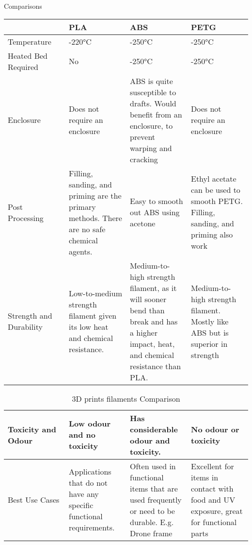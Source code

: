 \documentclass[class=report,11pt,crop=false]{standalone}
\begin{document}
Comparisons
\begin{table}[h]
\centering
\begin{tabular}{|>{\raggedright\arraybackslash}p{0.25\linewidth}|>{\raggedright\arraybackslash}p{0.25\linewidth}|>{\raggedright\arraybackslash}p{0.25\linewidth}|>{\raggedright\arraybackslash}p{0.25\linewidth}|}
\hline
 & \textbf{PLA} & \textbf{ABS} & \textbf{PETG} \\ \hline
Temperature & 180-220°C & 210-250°C & 220-250°C \\ \hline
Heated Bed Required & No & 210-250°C & 220-250°C \\ \hline
Enclosure & Does not require an enclosure & ABS is quite susceptible to drafts. Would benefit from an enclosure, to prevent warping and cracking & Does not require an enclosure \\ \hline
Post Processing & Filling, sanding, and priming are the primary methods. There are no safe chemical agents. & Easy to smooth out ABS using acetone & Ethyl acetate can be used to smooth PETG. Filling, sanding, and priming also work \\ \hline
Strength and Durability & Low-to-medium strength filament given its low heat and chemical resistance. & Medium-to-high strength filament, as it will sooner bend than break and has a higher impact, heat, and chemical resistance than PLA. & Medium-to-high strength filament. Mostly like ABS but is superior in strength \\ \hline

\end{tabular}
\end{table}


\begin{table}
    \centering
    \begin{tabular}{|>{\centering\arraybackslash}p{0.25\linewidth}|>{\centering\arraybackslash}p{0.25\linewidth}|>{\centering\arraybackslash}p{0.25\linewidth}|>{\centering\arraybackslash}p{0.25\linewidth}|} \hline 
Toxicity and Odour & Low odour and no toxicity & Has considerable odour and toxicity. & No odour or toxicity \\ \hline
Best Use Cases & Applications that do not have any specific functional requirements. & Often used in functional items that are used frequently or need to be durable. E.g. Drone frame & Excellent for items in contact with food and UV exposure, great for functional parts \\ \hline
    \end{tabular}
    \caption{3D prints filaments Comparison}
    \label{tab:my_label1}
\end{table}
\end{document}
